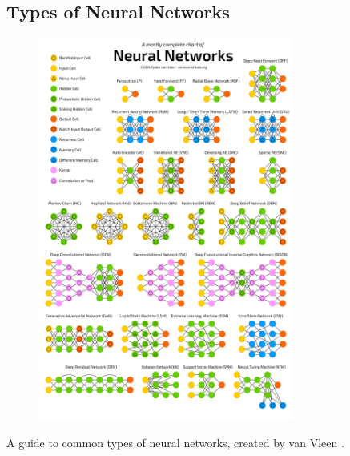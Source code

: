 \documentclass[12pt,letterpaper]{article}
\begin{document}
\newpage
\begin{appendices}
\section{Types of Neural Networks}
\label{appendix:types_of_networks}
\begin{figure}[ht]
\centering
\includegraphics[width=0.75\textwidth]{types_of_NN.png}
\end{figure}
\begin{center}A guide to common types of neural networks, created by van Vleen \cite{types_of_NN_pic}.\end{center}
\newpage


\end{appendices}
\end{document}
